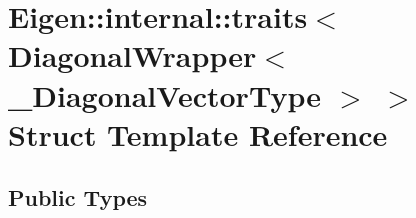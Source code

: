 \hypertarget{struct_eigen_1_1internal_1_1traits_3_01_diagonal_wrapper_3_01___diagonal_vector_type_01_4_01_4}{}\section{Eigen\+:\+:internal\+:\+:traits$<$ Diagonal\+Wrapper$<$ \+\_\+\+Diagonal\+Vector\+Type $>$ $>$ Struct Template Reference}
\label{struct_eigen_1_1internal_1_1traits_3_01_diagonal_wrapper_3_01___diagonal_vector_type_01_4_01_4}
\subsection*{Public Types}
